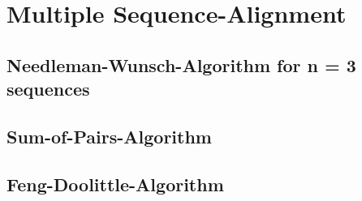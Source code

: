 
\section{Multiple Sequence-Alignment}
\label{sec:multi_alignment}

\subsection{Needleman-Wunsch-Algorithm for n = 3 sequences}
\label{sec:needleman_multi}

\subsection{Sum-of-Pairs-Algorithm}
\label{sec:sum_of_pairs}

\subsection{Feng-Doolittle-Algorithm}
\label{sec:feng_doolittle}

